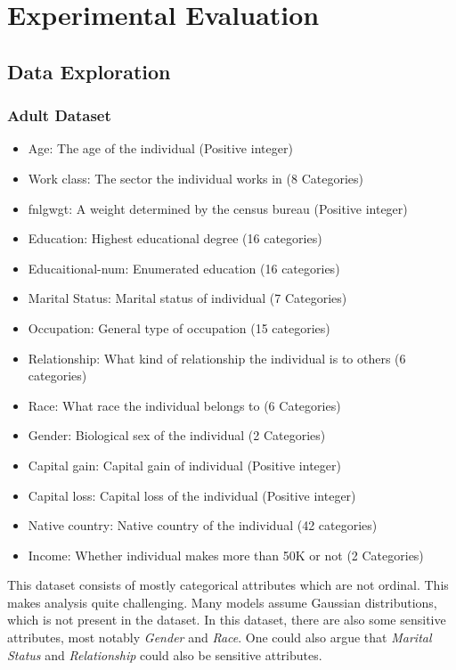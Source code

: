 
\chapter{Experimental Evaluation}
\label{ch:eval}

\section{Data Exploration}
\subsection{Adult Dataset}
\label{sec:adult}

\begin{itemize}
    \item Age: The age of the individual (Positive integer)
    \item Work class: The sector the individual works in (8 Categories)
    \item fnlgwgt: A weight determined by the census bureau (Positive integer)
    \item Education: Highest educational degree (16 categories)
    \item Educaitional-num: Enumerated education (16 categories)
    \item Marital Status: Marital status of individual (7 Categories)
    \item Occupation: General type of occupation (15 categories)
    \item Relationship: What kind of relationship the individual is to others (6 categories)
    \item Race: What race the individual belongs to (6 Categories)
    \item Gender: Biological sex of the individual (2 Categories)
    \item Capital gain: Capital gain of individual (Positive integer)
    \item Capital loss: Capital loss of the individual (Positive integer)
    \item Native country: Native country of the individual (42 categories)
    \item Income: Whether individual makes more than 50K or not (2 Categories)
\end{itemize}

This dataset consists of mostly categorical attributes which are not ordinal. This makes analysis quite challenging. Many models assume Gaussian distributions, which is not present in the dataset. In this dataset, there are also some sensitive attributes, most notably \emph{Gender} and \emph{Race}. One could also argue that \emph{Marital Status} and \emph{Relationship} could also be sensitive attributes.

